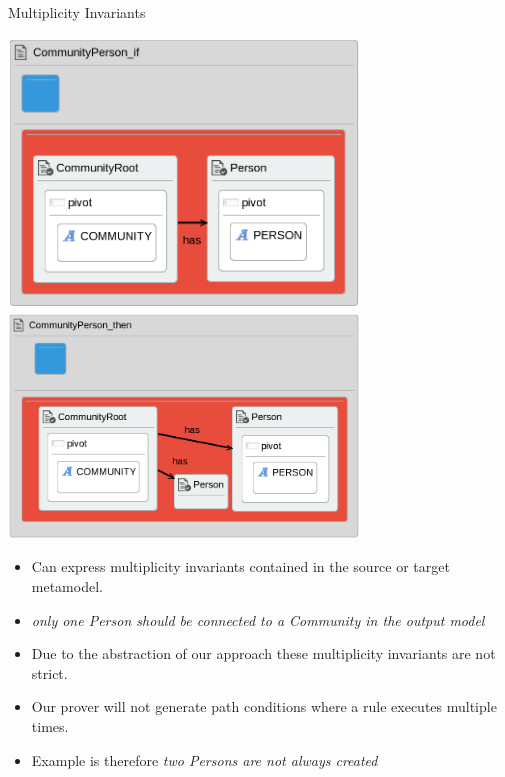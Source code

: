 \documentclass[xcolor=dvipsnames, 12pt, handout]{beamer}
\begin{document}
\begin{frame}{Multiplicity Invariants}
\begin{center}
\includegraphics[width=0.7\textwidth]{figures/communityPersonProp_if}
\includegraphics[width=0.7\textwidth]{figures/communityPersonProp_then}
\end{center}
\begin{itemize}
\item Can express multiplicity invariants contained
in the source or target metamodel.
\item \textit{only one Person should be connected to a Community in the output
model}
\end{itemize}
\begin{itemize}
\item Due to the abstraction of our approach these multiplicity invariants are not strict.
\item Our prover will not generate path conditions
where a rule executes multiple times.
\item Example is therefore \textit{two Persons are not always created}
\end{itemize}
\end{frame}
\end{document}
